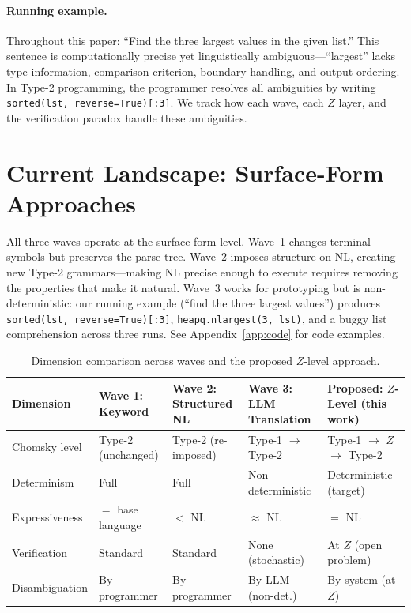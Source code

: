 \documentclass[11pt]{article}
\theoremstyle{definition}
\begin{document}
\paragraph{Running example.}
Throughout this paper: ``Find the three largest values in the given list.'' This sentence is computationally precise yet linguistically ambiguous---``largest'' lacks type information, comparison criterion, boundary handling, and output ordering. In Type-2 programming, the programmer resolves all ambiguities by writing \texttt{sorted(lst, reverse=True)[:3]}. We track how each wave, each $Z$ layer, and the verification paradox handle these ambiguities.


\section{Current Landscape: Surface-Form Approaches}\label{sec:landscape}

All three waves operate at the surface-form level. Wave~1 changes terminal symbols but preserves the parse tree. Wave~2 imposes structure on NL, creating new Type-2 grammars---making NL precise enough to execute requires removing the properties that make it natural. Wave~3 works for prototyping but is non-deterministic: our running example (``find the three largest values'') produces \texttt{sorted(lst, reverse=True)[:3]}, \texttt{heapq.nlargest(3, lst)}, and a buggy list comprehension across three runs. See Appendix~\ref{app:code} for code examples.

\begin{table}[t]
\centering
\caption{Dimension comparison across waves and the proposed $Z$-level approach.}
\label{tab:waves}
\small
\begin{tabularx}{\textwidth}{l L L L L}
\toprule
\textbf{Dimension} & \textbf{Wave 1: Keyword} & \textbf{Wave 2: Structured NL} & \textbf{Wave 3: LLM Translation} & \textbf{Proposed: $Z$-Level (this work)} \\
\midrule
Chomsky level & Type-2 (unchanged) & Type-2 (re-imposed) & Type-1 $\to$ Type-2 & Type-1 $\to$ $Z$ $\to$ Type-2 \\
Determinism & Full & Full & Non-deterministic & Deterministic (target) \\
Expressiveness & $=$ base language & $<$ NL & $\approx$ NL & $=$ NL \\
Verification & Standard & Standard & None (stochastic) & At $Z$ (open problem) \\
Disambiguation & By programmer & By programmer & By LLM (non-det.) & By system (at $Z$) \\
\bottomrule
\end{tabularx}
\end{table}
\end{document}
